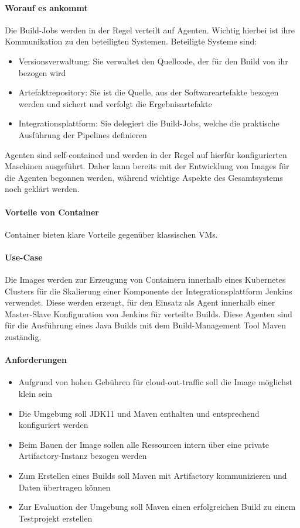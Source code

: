\paragraph{Worauf es ankommt}
Die Build-Jobs werden in der Regel verteilt auf Agenten. Wichtig hierbei ist ihre Kommunikation zu den beteiligten Systemen. Beteiligte Systeme sind:
\begin{itemize}
    \item Versionsverwaltung: Sie verwaltet den Quellcode, der für den Build von ihr bezogen wird
    \item Artefaktrepository: Sie ist die Quelle, aus der Softwareartefakte bezogen werden und sichert und verfolgt die Ergebnisartefakte
    \item Integrationsplattform: Sie delegiert die Build-Jobs, welche die praktische Ausführung der Pipelines definieren
\end{itemize}

Agenten sind self-contained und werden in der Regel auf hierfür konfigurierten Maschinen ausgeführt. Daher kann bereits mit der Entwicklung von Images für die Agenten begonnen werden, während wichtige Aspekte des Gesamtsystems noch geklärt werden.

\paragraph{Vorteile von Container}
Container bieten klare Vorteile gegenüber klassischen VMs. 

\paragraph{Use-Case}
Die Images werden zur Erzeugung von Containern innerhalb eines Kubernetes Clusters für die Skalierung einer Komponente der Integrationsplattform Jenkins verwendet. Diese werden erzeugt, für den Einsatz als Agent innerhalb einer Master-Slave Konfiguration von Jenkins für verteilte Builds. Diese Agenten sind für die Ausführung eines Java Builds mit dem Build-Management Tool Maven zuständig.

\paragraph{Anforderungen}
\begin{itemize}
    \item Aufgrund von hohen Gebühren für cloud-out-traffic soll die Image möglichst klein sein
    \item Die Umgebung soll \ac{JDK11} und Maven enthalten und entsprechend konfiguriert werden
    \item Beim Bauen der Image sollen alle Ressourcen intern über eine private Artifactory-Instanz bezogen werden
    \item Zum Erstellen eines Builds soll Maven mit Artifactory kommunizieren und Daten übertragen können
    \item Zur Evaluation der Umgebung soll Maven einen erfolgreichen Build zu einem Testprojekt erstellen
\end{itemize}




